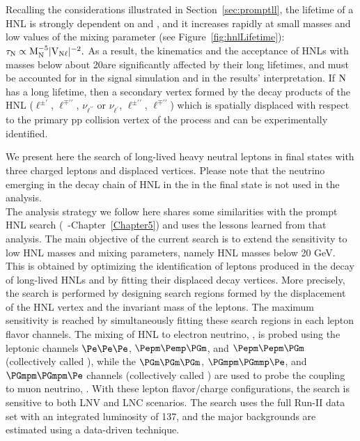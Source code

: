 Recalling the considerations illustrated in Section~\ref{sec:promptll}, the lifetime of a HNL is strongly dependent on \mhnl and \mixpar,
and it increases rapidly at small masses and low values of the mixing
parameter (see Figure~\ref{fig:hnlLifetime}):
\(\tau_\mathrm{N}\propto\mathrm{M_{\mathrm{N}}^{-5}|V_{\mathrm{N}\ell}|^{-2}}.\)
As a result, the kinematics and the acceptance of HNLs with masses
below about 20\GeV are significantly affected by their long lifetimes,
and must be accounted for in the signal simulation and in the results'
interpretation.
If $\mathrm{N}$ has a long lifetime, then a secondary vertex formed by the decay products of the HNL ($\ell^{\pm\prime}$, $\ell^{\mp\prime\prime}$, $\nu_{\ell^{\prime\prime}}$ or
$\nu_{\ell^{\prime}}$, $\ell^{\pm\prime\prime}$,
$\ell^{\mp\prime\prime}$) which is spatially displaced with respect to
the primary pp collision vertex of the process and can be experimentally identified. 

We present here the search of long-lived heavy neutral leptons in final states
with three charged leptons and displaced vertices. Please note that
the neutrino emerging in the decay chain of HNL in the in the final state is not used in the analysis.\\
The analysis strategy we follow here shares some similarities with the
prompt HNL search (~\cite{Sirunyan:2018mtv}-Chapter~\ref{Chapter5})
and uses the lessons learned from that
analysis. 
The main objective of the current search is to extend the
sensitivity to low HNL masses and mixing parameters, namely HNL masses
below 20 GeV. This is obtained by optimizing the identification
of leptons produced in the decay of long-lived HNLs and by fitting
their displaced decay vertices. More precisely, the search is
performed by designing search regions formed by the displacement of
the HNL vertex and the invariant mass of the \displ leptons. The
maximum sensitivity is reached by simultaneously fitting these search
regions in each lepton flavor channels. The mixing of HNL to electron
neutrino, \mixpare, is probed using the leptonic channels 
$\Pe\Pe\Pe$, $\Pepm\Pemp\PGm$, and $\Pepm\Pepm\PGm$ (collectively
called \eex),
while the $\PGm\PGm\PGm$,  $\PGmpm\PGmmp\Pe$, and $\PGmpm\PGmpm\Pe$
channels (collectively called \mmx) are used to probe the coupling to
muon neutrino, \mixparm.
With these lepton flavor/charge configurations, the search is
sensitive to both LNV and LNC scenarios.
The search uses the full Run-II data set with an integrated luminosity
of 137\fbinv, and the major backgrounds are estimated using a
data-driven technique.

